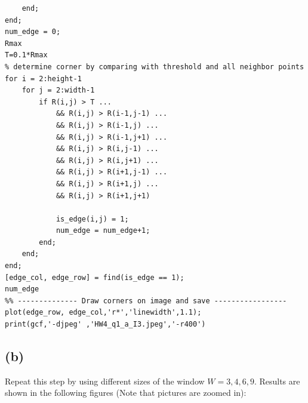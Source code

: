 \documentclass[letterpaper]{article}
\begin{document}
\begin{lstlisting}
    end;
end;
num_edge = 0;
Rmax
T=0.1*Rmax
% determine corner by comparing with threshold and all neighbor points
for i = 2:height-1
    for j = 2:width-1
        if R(i,j) > T ...
            && R(i,j) > R(i-1,j-1) ...
            && R(i,j) > R(i-1,j) ...
            && R(i,j) > R(i-1,j+1) ...
            && R(i,j) > R(i,j-1) ...
            && R(i,j) > R(i,j+1) ...
            && R(i,j) > R(i+1,j-1) ...
            && R(i,j) > R(i+1,j) ...
            && R(i,j) > R(i+1,j+1)

            is_edge(i,j) = 1;
            num_edge = num_edge+1;
        end;
    end;
end;
[edge_col, edge_row] = find(is_edge == 1);
num_edge
%% -------------- Draw corners on image and save -----------------
plot(edge_row, edge_col,'r*','linewidth',1.1);
print(gcf,'-djpeg' ,'HW4_q1_a_I3.jpeg','-r400')
\end{lstlisting}
\subsection*{(b)}
Repeat this step by using different sizes of the window $W = 3, 4, 6, 9$. Results are shown in the following figures (Note that pictures are zoomed in):\\
\end{document}
